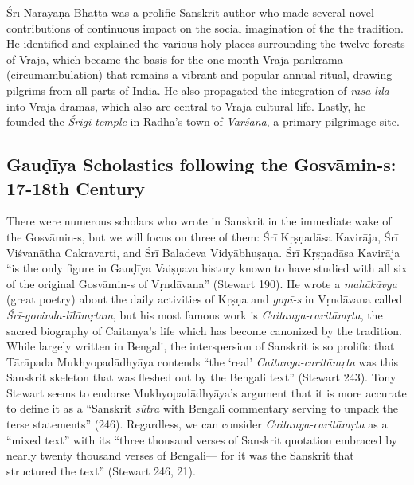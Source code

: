 Śrī Nārayaṇa Bhaṭṭa was a prolific Sanskrit author who made several novel contributions of continuous impact on the social imagination of the the tradition. He identified and explained the various holy places surrounding the twelve forests of Vraja, which became the basis for the one month Vraja parīkrama (circumambulation) that remains a vibrant and popular annual ritual, drawing pilgrims from all parts of India. He also propagated the integration of {\sl rāsa līlā} into Vraja dramas, which also are central to Vraja cultural life. Lastly, he founded the {\sl Śrigi temple} in Rādha’s town of {\sl Varśana}, a primary pilgrimage site. 
\vskip -8pt

\subsection*{Gauḍīya Scholastics following the Gosvāmin-s: 17-18th Century}
\vskip -7pt

There were numerous scholars who wrote in Sanskrit in the immediate wake of the Gosvāmin-s, but we will focus on three of them: Śrī Kṛṣṇadāsa Kavirāja, Śrī Viśvanātha Cakravarti, and Śrī Baladeva Vidyābhuṣaṇa. Śrī Kṛṣṇadāsa Kavirāja “is the only figure in Gauḍīya Vaiṣṇava history known to have studied with all six of the original Gosvāmin-s of Vṛndāvana” (Stewart 190). He wrote a {\sl mahākāvya} (great poetry) about the daily activities of Kṛṣṇa and {\sl gopī-s} in Vṛndāvana called {\sl Śrī-govinda-līlāmṛtam}, but his most famous work is {\sl Caitanya-caritāmṛta}, the sacred biography of Caitanya’s life which has become canonized by the tradition. While largely written in Bengali, the interspersion of Sanskrit is so prolific that Tārāpada Mukhyopadādhyāya contends “the ‘real’ {\sl Caitanya-caritāmṛta} was this Sanskrit skeleton that was fleshed out by the Bengali text” (Stewart 243). Tony Stewart seems to endorse Mukhyopadādhyāya’s argument that it is more accurate to define it as a “Sanskrit {\sl sūtra} with Bengali commentary serving to unpack the terse statements” (246). Regardless, we can consider {\sl Caitanya-caritāmṛta} as a “mixed text” with its “three thousand verses of Sanskrit quotation embraced by nearly twenty thousand verses of Bengali— for it was the Sanskrit that structured the text” (Stewart 246, 21). 

